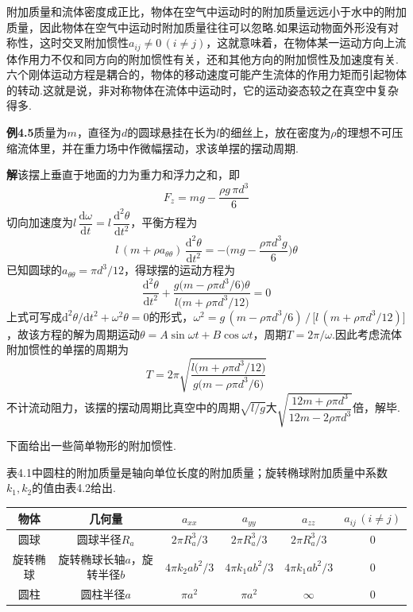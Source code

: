 附加质量和流体密度成正比，物体在空气中运动时的附加质量远远小于水中的附加质量，因此物体在空气中运动时附加质量往往可以忽略.如果运动物面外形没有对称性，这时交叉附加惯性$a_{ij}\neq 0\,(i\neq j)$，这就意味着，在物体某一运动方向上流体作用力不仅和同方向的附加惯性有关，还和其他方向的附加惯性及加速度有关.六个刚体运动方程是耦合的，物体的移动速度可能产生流体的作用力矩而引起物体的转动.这就是说，非对称物体在流体中运动时，它的运动姿态较之在真空中复杂得多.

\noindent\textbf{例4.5}\quad 质量为$m$，直径为$d$的圆球悬挂在长为$l$的细丝上，放在密度为$\rho$的理想不可压缩流体里，并在重力场中作微幅摆动，求该单摆的摆动周期.

\noindent\textbf{解}\quad 该摆上垂直于地面的力为重力和浮力之和，即
\[
F_z=mg-\frac{\rho g\,\pi d^{3}}{6}
\]
切向加速度为$l\,\dfrac{\mathrm{d}\omega}{\mathrm{d}t}=l\,\dfrac{\mathrm{d}^{2}\theta}{\mathrm{d}t^{2}}$，平衡方程为
\[
l\,(m+\rho a_{\theta\theta})\,\frac{\mathrm{d}^{2}\theta}{\mathrm{d}t^{2}}=-\Big(mg-\frac{\rho\pi d^{3}g}{6}\Big)\theta
\]
已知圆球的$a_{\theta\theta}=\pi d^{3}/12$，得球摆的运动方程为
\[
\frac{\mathrm{d}^{2}\theta}{\mathrm{d}t^{2}}+\frac{g\big(m-\rho\pi d^{3}/6\big)\theta}{l\big(m+\rho\pi d^{3}/12\big)}=0
\]
上式可写成$\mathrm{d}^{2}\theta/\mathrm{d}t^{2}+\omega^{2}\theta=0$的形式，$\omega^{2}=g\,(m-\rho\pi d^{3}/6)\,/\,\big[l\,(m+\rho\pi d^{3}/12)\big]$，故该方程的解为周期运动$\theta=A\sin\omega t+B\cos\omega t$，周期$T=2\pi/\omega$.因此考虑流体附加惯性的单摆的周期为
\[
T=2\pi\sqrt{\frac{l\big(m+\rho\pi d^{3}/12\big)}{g\big(m-\rho\pi d^{3}/6\big)}}
\]
不计流动阻力，该摆的摆动周期比真空中的周期$\sqrt{l/g}$大$\sqrt{\dfrac{12m+\rho\pi d^{3}}{12m-2\rho\pi d^{3}}}$倍，解毕.

下面给出一些简单物形的附加惯性.

表4.1中圆柱的附加质量是轴向单位长度的附加质量；旋转椭球附加质量中系数$k_1,k_2$的值由表4.2给出.

\begin{center}
\begin{tabular}{|c|c|c|c|c|c|}
\hline
物体 & 几何量 & $a_{xx}$ & $a_{yy}$ & $a_{zz}$ & $a_{ij}\,(i\neq j)$\\
\hline
圆球 & 圆球半径$R_a$ & $2\pi R_a^{3}/3$ & $2\pi R_a^{3}/3$ & $2\pi R_a^{3}/3$ & $0$\\
\hline
旋转椭球 & 旋转椭球长轴$a$，旋转半径$b$ & $4\pi k_2 ab^{2}/3$ & $4\pi k_1 ab^{2}/3$ & $4\pi k_1 ab^{2}/3$ & $0$\\
\hline
圆柱 & 圆柱半径$a$ & $\pi a^{2}$ & $\pi a^{2}$ & $\infty$ & $0$\\
\hline
\end{tabular}
\end{center}

